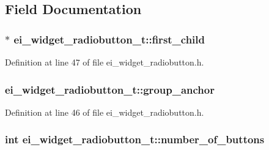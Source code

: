 \subsection{Field Documentation}
\hypertarget{structei__widget__radiobutton__t_a3f0ddebff6ebeace0664fb069b2bed57}{
\subsubsection[{first\-\_\-child}]{$\ast$ ei\-\_\-widget\-\_\-radiobutton\-\_\-t\-::first\-\_\-child}}\label{structei__widget__radiobutton__t_a3f0ddebff6ebeace0664fb069b2bed57}


Definition at line 47 of file ei\-\_\-widget\-\_\-radiobutton.\-h.

\hypertarget{structei__widget__radiobutton__t_a115a17bdb5ddbaabc17bab9c562869c5}{
\subsubsection[{group\-\_\-anchor}]{ ei\-\_\-widget\-\_\-radiobutton\-\_\-t\-::group\-\_\-anchor}}\label{structei__widget__radiobutton__t_a115a17bdb5ddbaabc17bab9c562869c5}


Definition at line 46 of file ei\-\_\-widget\-\_\-radiobutton.\-h.

\hypertarget{structei__widget__radiobutton__t_a33208c02fd6243e13d748a024d7ba337}{
\subsubsection[{number\-\_\-of\-\_\-buttons}]{\setlength{\rightskip}{0pt plus 5cm}int ei\-\_\-widget\-\_\-radiobutton\-\_\-t\-::number\-\_\-of\-\_\-buttons}}\label{structei__widget__radiobutton__t_a33208c02fd6243e13d748a024d7ba337}


